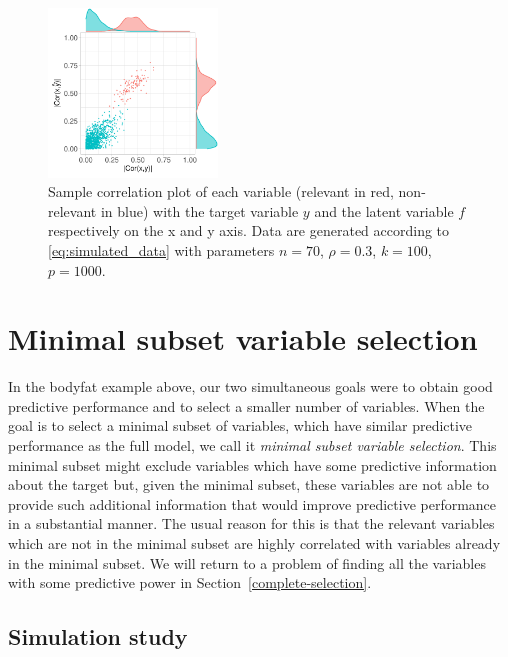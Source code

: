 \documentclass[a4]{article}
\theoremstyle{definition}
\begin{document}
\begin{figure}[tp]
  \centering
  \vspace{-5mm}
  \includegraphics[width=0.4\textwidth]{graphics/correlation.pdf}
  \caption{Sample correlation plot of each variable (relevant in red, 
  non-relevant in blue) with the target variable $y$ and the latent variable 
  $f$ respectively on the x and y axis. Data are generated according to 
  \eqref{eq:simulated_data} with parameters $n=70$, $\rho=0.3$,
  $k=100$, $p=1000$.\\}
  \label{fig:correlation}
\end{figure}

\hypertarget{comparison-minimal-subset}{
\section{Minimal subset variable selection}\label{comparison-minimal-subset}}

In the bodyfat example above, our two simultaneous goals were to 
obtain good predictive performance and to select a smaller number of variables. 
When the goal is to select a minimal subset of variables,
which have similar predictive performance as the full model, we call it
\emph{minimal subset variable selection}. This minimal subset might
exclude variables which have some predictive information about the
target but, given the minimal subset, these variables are not able to
provide such additional information that would improve predictive
performance in a substantial manner.
The usual reason for this is that the relevant variables
which are not in the minimal subset are highly correlated with variables already in
the minimal subset. We will return to a problem of finding all
the variables with some predictive power in Section~\ref{complete-selection}.

\subsection{Simulation study}
\end{document}
